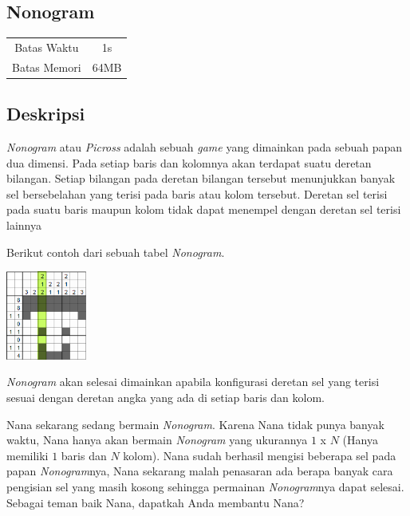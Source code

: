 \documentclass{article}
\begin{document}
\begin{center}
    \section*{Nonogram} %

    \begin{tabular}{ | c c | }
        \hline
        Batas Waktu  & 1s \\    %
        Batas Memori & 64MB \\  %
        \hline
    \end{tabular}
\end{center}

\subsection*{Deskripsi}

\textit{Nonogram} atau \textit{Picross} adalah sebuah \textit{game} yang dimainkan pada sebuah papan dua dimensi.
Pada setiap baris dan kolomnya akan terdapat suatu deretan bilangan.
Setiap bilangan pada deretan bilangan tersebut menunjukkan banyak sel bersebelahan 
yang terisi pada baris atau kolom tersebut. Deretan sel terisi pada suatu baris maupun kolom tidak 
dapat menempel dengan deretan sel terisi lainnya

Berikut contoh dari sebuah tabel \textit{Nonogram}.

\includegraphics[width=100px]{Homogram-Steve}

 \textit{Nonogram} akan selesai dimainkan apabila konfigurasi deretan sel yang terisi 
sesuai dengan deretan angka yang ada di setiap baris dan kolom.

Nana sekarang sedang bermain \textit{Nonogram}. Karena Nana tidak punya banyak waktu, 
Nana hanya akan bermain \textit{Nonogram} yang ukurannya $1$ x $N$ (Hanya memiliki $1$ baris dan $N$ kolom). 
Nana sudah berhasil mengisi beberapa sel pada papan \textit{Nonogram}nya, Nana sekarang malah penasaran ada 
berapa banyak cara pengisian sel yang masih kosong sehingga permainan \textit{Nonogram}nya dapat selesai. Sebagai teman baik Nana, dapatkah Anda membantu Nana?
\end{document}
